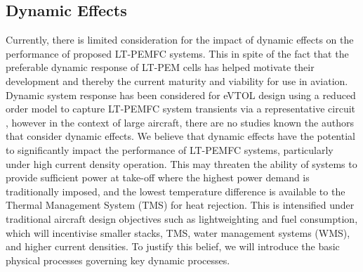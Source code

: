 \subsection{Dynamic Effects} \label{sec:effects}
Currently, there is limited consideration for the impact of dynamic effects on the performance of proposed LT-PEMFC systems.
This in spite of the fact that the preferable dynamic response of LT-PEM cells has helped motivate their development and thereby the current maturity and viability for use in aviation.
Dynamic system response has been considered for eVTOL design using a reduced order model to capture LT-PEMFC system transients via a representative circuit \cite{ngHydrogenFuelCells2019a}, however in the context of large aircraft, there are no studies known the authors that consider dynamic effects.
We believe that dynamic effects have the potential to significantly impact the performance of LT-PEMFC systems, particularly under high current density operation.
This may threaten the ability of systems to provide sufficient power at take-off where the highest power demand is traditionally imposed, and the lowest temperature difference is available to the Thermal Management System (TMS) for heat rejection.
This is intensified under  traditional aircraft design objectives such as lightweighting and fuel consumption, which will incentivise smaller stacks, TMS, water management systems (WMS), and higher current densities.
To justify this belief, we will introduce the basic physical processes governing key dynamic processes.

